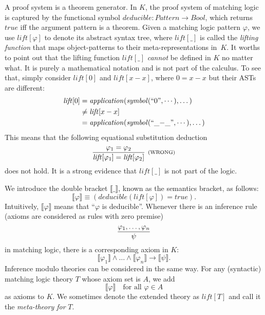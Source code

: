 \documentclass[UTF8]{article}
\theoremstyle{plain}
\theoremstyle{definition}
\theoremstyle{remark}
\newcommand{\Bracket}[1]
    {\llbracket#1\rrbracket}
\newcommand{\rl}[1]{\text{\scriptsize{(#1)}}}
\begin{document}
A proof system is a theorem generator. 
In $K$, the proof system of matching logic is captured by the functional symbol $\mathit{deducible} \colon \mathit{Pattern} \to \mathit{Bool}$, which returns $\mathit{true}$ iff the argument pattern is a theorem. 
Given a matching logic pattern $\varphi$, we use $\mathit{lift[\varphi]}$ to 
denote its 
abstract syntax tree, where $\mathit{lift}[\_]$ is called the \emph{lifting 
function}
that maps object-patterns to their meta-representations in~$K$.
It worths to point out that the lifting function $\mathit{lift}[\_]$  \emph{cannot} be defined in $K$ no matter what.
It is purely a mathematical notation and is not part of the calculus.
To see that, simply consider $\mathit{lift}[0]$ and $\mathit{lift}[x - x]$, 
where $0 = 
x - x$ but their ASTs are different:
\begin{align*}
\mathit{lift}[0]
&= \mathit{application}(\mathit{symbol}(``\text{0}", \cdots),\dots) \\
&\neq \mathit{lift}[x - x] \\
&= \mathit{application}(\mathit{symbol}(``\text{\_$-$\_}",\cdots), \dots)
\end{align*}
This means that the following equational substitution deduction
$$
\infer[\rl{WRONG}]{\mathit{lift}[\varphi_1] = \mathit{lift}[\varphi_2]}
{\varphi_1 = \varphi_2}
$$
does not hold. It is a strong evidence that $\mathit{lift}[\_]$ is not part of 
the logic.

We introduce the double bracket $\Bracket{\_}$, known as the semantics bracket, as follows:
\begin{equation*}
\Bracket{\varphi} \equiv 
\left(\textit{deducible}\left(\mathit{lift}[\varphi]\right) = true\right).
\end{equation*}
Intuitively, $\Bracket{\varphi}$ means that ``$\varphi$ is deducible''.
Whenever there is an inference rule (axioms are considered as rules with zero 
premise)
$$
	\infer{\psi}
	{\varphi_1,\dots,\varphi_n}
$$
in matching logic, there is a corresponding axiom in $K$:
$$
	\Bracket{\varphi_1} \wedge \dots \wedge \Bracket{\varphi_n} \to \Bracket{\psi}.
$$
Inference modulo theories can be considered in the same way. 
For any (syntactic) matching logic theory $T$ whose axiom set is $A$, we add
$$
\Bracket{\varphi} \quad \text{for all $\varphi \in A$}
$$
as axioms to $K$. We sometimes denote the extended theory as $\mathit{lift}[T]$ 
and call it 
the \emph{meta-theory for} $T$.
\end{document}
